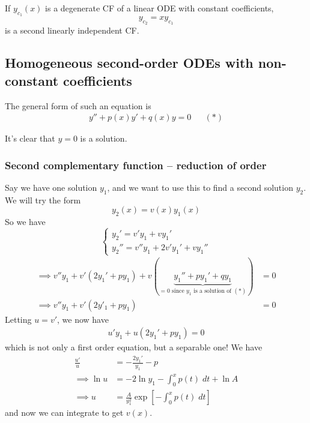 \documentclass{../template/note}
\begin{document}
    \begin{proposition}
        If \(y_{c_1}(x)\) is a degenerate CF of a linear ODE with constant coefficients,
        \[
            y_{c_2} = xy_{c_1}
        \]
        is a second linearly independent CF.
    \end{proposition}
    
    
    

    \subsection{Homogeneous second-order ODEs with non-constant coefficients}

    The general form of such an equation is
    \begin{align*}
        y'' + p(x)y' + q(x)y = 0 && (*)   
    \end{align*}

    It's clear that \(y = 0\) is a solution.

    \subsubsection{Second complementary function -- reduction of order}

    Say we have one solution \(y_1\), and we want to use this to find a second solution \(y_2\). We will try the form
    \[
        y_2(x) = v(x)y_1(x)
    \]
    So we have
    \[
        \begin{cases}
            y_2' = v'y_1 + vy_1' \\
            y_2'' = v''y_1 + 2v'y_1' + vy_1''
        \end{cases}
    \]
    \begin{align*}
        \implies v''y_1 + v'(2y_1' + py_1) + v(\underbrace{y_1'' + py_1' + qy_1}_{=0 \text{ since } y_1 \text{ is a solution of } (*)}) &= 0 \\
        \implies v''y_1 + v'(2y'_1 + py_1) &= 0       
    \end{align*}
    Letting \(u = v'\), we now have
    \begin{align*}
        u'y_1 + u(2y_1' + py_1) = 0
    \end{align*}
    which is not only a first order equation, but a separable one! We have
    \begin{align*}
        \frac{u'}{u} &= -\frac{2y_1'}{y_1} - p \\
        \implies \ln u &= -2 \ln y_1 - \int_0^x p(t) \; dt + \ln A \\
        \implies u &= \frac{A}{y_1^2}\exp\left[-\int_0^x p(t) \; dt\right]
    \end{align*}
    and now we can integrate to get \(v(x)\).
    
\end{document}

